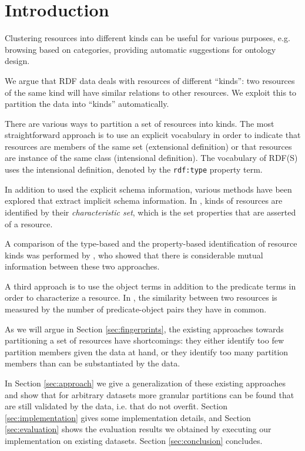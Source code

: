 \section{Introduction}
\label{sec:intro}
\label{sec:relwork}

Clustering resources into different kinds can be useful
 for various purposes, e.g. browsing based on categories,
 providing automatic suggestions for ontology design.

We argue that RDF data deals with resources of different ``kinds'':
 two resources of the same kind will have similar relations
 to other resources.
We exploit this to partition the data into ``kinds'' automatically.

There are various ways to partition a set of resources into kinds.
The most straightforward approach is to use an explicit vocabulary
 in order to indicate
   that resources are members of the same set (extensional definition)
 or
   that resources are instance of the same class (intensional definition).
The vocabulary of RDF(S) \cite{BrickleyGuha2014} uses
 the intensional definition,
 denoted by the \texttt{rdf:type} property term.

In addition to used the explicit schema information,
 various methods have been explored that
 extract implicit schema information.
In \cite{NeumannMoerkotte2011},
 kinds of resources are identified
 by their \emph{characteristic set},
 which is the set properties that are asserted of a resource.

A comparison of the type-based and the property-based
 identification of resource kinds was performed by \cite{GottronKSS13},
 who showed that there is considerable mutual information between
 these two approaches.

A third approach is to use the object terms in addition to the predicate terms
 in order to characterize a resource.
In \cite{buikstra2011ranking}, the similarity between two resources
 is measured by the number of predicate-object pairs they have in common.

As we will argue in Section \ref{sec:fingerprints},
 the existing approaches towards partitioning a set of resources
 have shortcomings: they either identify too few partition members
 given the data at hand, or they identify too many partition members
 than can be substantiated by the data. 

In Section \ref{sec:approach} we give a generalization of
 these existing approaches and show that for arbitrary datasets
 more granular partitions can be found that are still validated
 by the data, i.e. that do not overfit.
Section \ref{sec:implementation} gives some implementation details,
 and Section \ref{sec:evaluation} shows the evaluation results we
 obtained by executing our implementation on existing datasets.
Section \ref{sec:conclusion} concludes.

